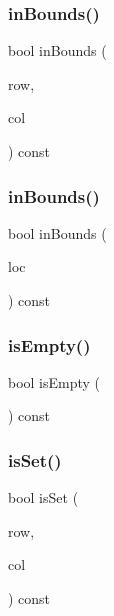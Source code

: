 \subsubsection{\texorpdfstring{in\+Bounds()}{inBounds()}\hspace{0.1cm}{\footnotesize\ttfamily [1/2]}}
{\footnotesize\ttfamily bool in\+Bounds (\begin{DoxyParamCaption}\item[{int}]{row,  }\item[{int}]{col }\end{DoxyParamCaption}) const}

\mbox{\label{classSparseGrid_a1b7d34c13c853a2ac9bdc084ec1535e9}} 
\subsubsection{\texorpdfstring{in\+Bounds()}{inBounds()}\hspace{0.1cm}{\footnotesize\ttfamily [2/2]}}
{\footnotesize\ttfamily bool in\+Bounds (\begin{DoxyParamCaption}\item[{const \mbox{\hyperlink{structGridLocation}{Grid\+Location}} \&}]{loc }\end{DoxyParamCaption}) const}

\mbox{\label{classSparseGrid_acf82f9b2937375c7b1cf3dccb3df3312}} 
\subsubsection{\texorpdfstring{is\+Empty()}{isEmpty()}}
{\footnotesize\ttfamily bool is\+Empty (\begin{DoxyParamCaption}{ }\end{DoxyParamCaption}) const}

\mbox{\label{classSparseGrid_ada2cb2e1981ec086e03f1c4133fb693e}} 
\subsubsection{\texorpdfstring{is\+Set()}{isSet()}\hspace{0.1cm}{\footnotesize\ttfamily [1/2]}}
{\footnotesize\ttfamily bool is\+Set (\begin{DoxyParamCaption}\item[{int}]{row,  }\item[{int}]{col }\end{DoxyParamCaption}) const}

